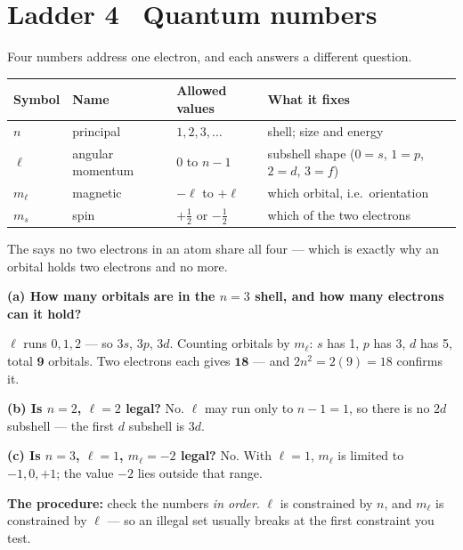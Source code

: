 \documentclass{apchem-worksheet}
\begin{document}
\section*{\sffamily Ladder 4 \textbullet\ Quantum numbers}

Four numbers address one electron, and each answers a different question.

\begin{center}
\renewcommand{\arraystretch}{1.25}
\begin{tabular}{@{}p{1.4cm}p{3.4cm}p{4.2cm}p{4.2cm}@{}}
\hline
\textbf{Symbol} & \textbf{Name} & \textbf{Allowed values} &
  \textbf{What it fixes} \\
\hline
$n$ & principal & $1, 2, 3, \ldots$ & shell; size and energy \\
$\ell$ & angular momentum & $0$ to $n-1$ & subshell shape
  ($0=s$, $1=p$, $2=d$, $3=f$) \\
$m_\ell$ & magnetic & $-\ell$ to $+\ell$ & which orbital, i.e.\
  orientation \\
$m_s$ & spin & $+\tfrac{1}{2}$ or $-\tfrac{1}{2}$ & which of the two
  electrons \\
\hline
\end{tabular}
\end{center}

The  says no two electrons in an atom
share all four --- which is exactly why an orbital holds two electrons
and no more.

\begin{workedexample}
\textbf{(a) How many orbitals are in the $n = 3$ shell, and how many
electrons can it hold?}

$\ell$ runs $0, 1, 2$ --- so $3s$, $3p$, $3d$. Counting orbitals by
$m_\ell$: $s$ has 1, $p$ has 3, $d$ has 5, total $\mathbf{9}$ orbitals.
Two electrons each gives $\mathbf{18}$ --- and $2n^{2} = 2(9) = 18$
confirms it.

\textbf{(b) Is $n = 2$, $\ell = 2$ legal?} No. $\ell$ may run only to
$n - 1 = 1$, so there is no $2d$ subshell --- the first $d$ subshell is
$3d$.

\textbf{(c) Is $n = 3$, $\ell = 1$, $m_\ell = -2$ legal?} No. With
$\ell = 1$, $m_\ell$ is limited to $-1, 0, +1$; the value $-2$ lies
outside that range.

\textbf{The procedure:} check the numbers \emph{in order}. $\ell$ is
constrained by $n$, and $m_\ell$ is constrained by $\ell$ --- so an
illegal set usually breaks at the first constraint you test.
\end{workedexample}
\end{document}
